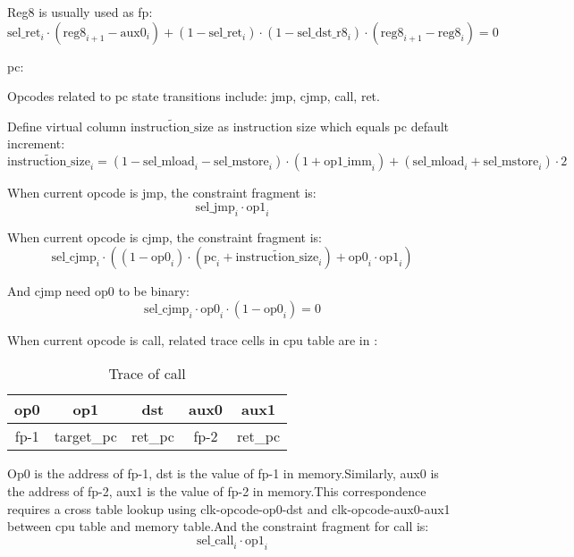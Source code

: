 Reg8 is usually used as fp:
\[ \mathrm{sel\_ret}_i \cdot (\mathrm{reg8}_{i+1} - \mathrm{aux0}_i) + (1-\mathrm{sel\_ret}_i) \cdot (1 - \mathrm{sel\_dst\_r8}_i) \cdot (\mathrm{reg8}_{i+1} - \mathrm{reg8}_i)=0 \]

pc:

Opcodes related to pc state transitions include: jmp, cjmp, call, ret.

Define virtual column $\widetilde{\mathrm{instruction\_size}}$ as instruction size which equals pc default increment:
\[ \widetilde{\mathrm{instruction\_size}}_i = (1 - \mathrm{sel\_mload}_i - \mathrm{sel\_mstore}_i) \cdot (1 + \mathrm{op1\_imm}_i) + (\mathrm{sel\_mload}_i + \mathrm{sel\_mstore}_i) \cdot 2 \]

When current opcode is jmp, the constraint fragment is:
\[ \mathrm{sel\_jmp}_i \cdot \mathrm{op1}_i \]

When current opcode is cjmp, the constraint fragment is:
\[ \mathrm{sel\_cjmp}_i \cdot ((1 - \mathrm{op0}_i) \cdot (\mathrm{pc}_i + \widetilde{\mathrm{instruction\_size}}_i) + \mathrm{op0}_i \cdot \mathrm{op1}_i) \]

And cjmp need op0 to be binary:
\[ \mathrm{sel\_cjmp}_i \cdot \mathrm{op0}_i \cdot (1-\mathrm{op0}_i) = 0 \]

When current opcode is call, related trace cells in cpu table are in :

\begin{table}[!ht]
    \centering
    \begin{tabular}{|c|c|c|c|c|}
        \hline
        \rowcolor{gray} op0       & op1        & dst                          & aux0                     & aux1                        \\
        \hline
        \cellcolor{green!20} fp-1 & target\_pc & \cellcolor{green!20} ret\_pc & \cellcolor{blue!20} fp-2 & \cellcolor{blue!20} ret\_pc \\
        \hline
    \end{tabular}
    \caption{Trace of call}
    \label{table:constraint-call}
\end{table}

Op0 is the address of fp-1, dst is the value of fp-1 in memory.Similarly, aux0 is the address of fp-2, aux1 is the value of fp-2 in memory.This correspondence requires a
cross table lookup using clk-opcode-op0-dst and clk-opcode-aux0-aux1 between cpu table and memory table.And the constraint fragment for call is:
\[ \mathrm{sel\_call}_i \cdot \mathrm{op1}_i \]

